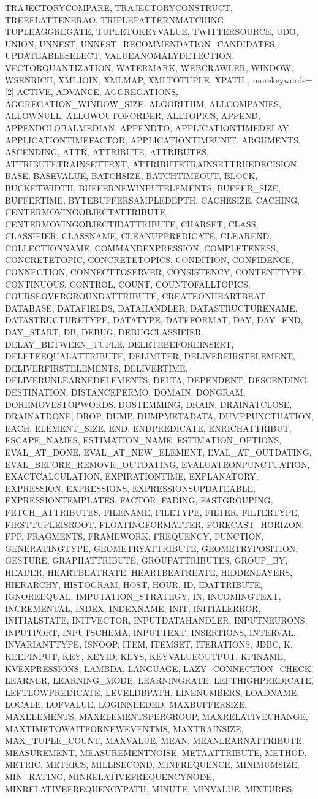 {{TRAJECTORYCOMPARE, TRAJECTORYCONSTRUCT, TREEFLATTENERAO, TRIPLEPATTERNMATCHING, TUPLEAGGREGATE, TUPLETOKEYVALUE, TWITTERSOURCE, UDO, UNION, UNNEST, UNNEST_RECOMMENDATION_CANDIDATES, UPDATEABLESELECT, VALUEANOMALYDETECTION, VECTORQUANTIZATION, WATERMARK, WEBCRAWLER, WINDOW, WSENRICH, XMLJOIN, XMLMAP, XMLTOTUPLE, XPATH%
      },%
   morekeywords=[2]{%
ACTIVE, ADVANCE, AGGREGATIONS, AGGREGATION_WINDOW_SIZE, ALGORITHM, ALLCOMPANIES, ALLOWNULL, ALLOWOUTOFORDER, ALLTOPICS, APPEND, APPENDGLOBALMEDIAN, APPENDTO, APPLICATIONTIMEDELAY, APPLICATIONTIMEFACTOR, APPLICATIONTIMEUNIT, ARGUMENTS, ASCENDING, ATTR, ATTRIBUTE, ATTRIBUTES, ATTRIBUTETRAINSETTEXT, ATTRIBUTETRAINSETTRUEDECISION, BASE, BASEVALUE, BATCHSIZE, BATCHTIMEOUT, BLOCK, BUCKETWIDTH, BUFFERNEWINPUTELEMENTS, BUFFER_SIZE, BUFFERTIME, BYTEBUFFERSAMPLEDEPTH, CACHESIZE, CACHING, CENTERMOVINGOBJECTATTRIBUTE, CENTERMOVINGOBJECTIDATTRIBUTE, CHARSET, CLASS, CLASSIFIER, CLASSNAME, CLEANUPPREDICATE, CLEAREND, COLLECTIONNAME, COMMANDEXPRESSION, COMPLETENESS, CONCRETETOPIC, CONCRETETOPICS, CONDITION, CONFIDENCE, CONNECTION, CONNECTTOSERVER, CONSISTENCY, CONTENTTYPE, CONTINUOUS, CONTROL, COUNT, COUNTOFALLTOPICS, COURSEOVERGROUNDATTRIBUTE, CREATEONHEARTBEAT, DATABASE, DATAFIELDS, DATAHANDLER, DATASTRUCTURENAME, DATASTRUCTURETYPE, DATATYPE, DATEFORMAT, DAY, DAY_END, DAY_START, DB, DEBUG, DEBUGCLASSIFIER, DELAY_BETWEEN_TUPLE, DELETEBEFOREINSERT, DELETEEQUALATTRIBUTE, DELIMITER, DELIVERFIRSTELEMENT, DELIVERFIRSTELEMENTS, DELIVERTIME, DELIVERUNLEARNEDELEMENTS, DELTA, DEPENDENT, DESCENDING, DESTINATION, DISTANCEPERMO, DOMAIN, DONGRAM, DOREMOVESTOPWORDS, DOSTEMMING, DRAIN, DRAINATCLOSE, DRAINATDONE, DROP, DUMP, DUMPMETADATA, DUMPPUNCTUATION, EACH, ELEMENT_SIZE, END, ENDPREDICATE, ENRICHATTRIBUT, ESCAPE_NAMES, ESTIMATION_NAME, ESTIMATION_OPTIONS, EVAL_AT_DONE, EVAL_AT_NEW_ELEMENT, EVAL_AT_OUTDATING, EVAL_BEFORE_REMOVE_OUTDATING, EVALUATEONPUNCTUATION, EXACTCALCULATION, EXPIRATIONTIME, EXPLANATORY, EXPRESSION, EXPRESSIONS, EXPRESSIONSUPDATEABLE, EXPRESSIONTEMPLATES, FACTOR, FADING, FASTGROUPING, FETCH_ATTRIBUTES, FILENAME, FILETYPE, FILTER, FILTERTYPE, FIRSTTUPLEISROOT, FLOATINGFORMATTER, FORECAST_HORIZON, FPP, FRAGMENTS, FRAMEWORK, FREQUENCY, FUNCTION, GENERATINGTYPE, GEOMETRYATTRIBUTE, GEOMETRYPOSITION, GESTURE, GRAPHATTRIBUTE, GROUPATTRIBUTES, GROUP_BY, HEADER, HEARTBEATRATE, HEARTBEATREATE, HIDDENLAYERS, HIERARCHY, HISTOGRAM, HOST, HOUR, ID, IDATTRIBUTE, IGNOREEQUAL, IMPUTATION_STRATEGY, IN, INCOMINGTEXT, INCREMENTAL, INDEX, INDEXNAME, INIT, INITIALERROR, INITIALSTATE, INITVECTOR, INPUTDATAHANDLER, INPUTNEURONS, INPUTPORT, INPUTSCHEMA, INPUTTEXT, INSERTIONS, INTERVAL, INVARIANTTYPE, ISNOOP, ITEM, ITEMSET, ITERATIONS, JDBC, K, KEEPINPUT, KEY, KEYID, KEYS, KEYVALUEOUTPUT, KPINAME, KVEXPRESSIONS, LAMBDA, LANGUAGE, LAZY_CONNECTION_CHECK, LEARNER, LEARNING_MODE, LEARNINGRATE, LEFTHIGHPREDICATE, LEFTLOWPREDICATE, LEVELDBPATH, LINENUMBERS, LOADNAME, LOCALE, LOFVALUE, LOGINNEEDED, MAXBUFFERSIZE, MAXELEMENTS, MAXELEMENTSPERGROUP, MAXRELATIVECHANGE, MAXTIMETOWAITFORNEWEVENTMS, MAXTRAINSIZE, MAX_TUPLE_COUNT, MAXVALUE, MEAN, MEANLEARNATTRIBUTE, MEASUREMENT, MEASUREMENTNOISE, METAATTRIBUTE, METHOD, METRIC, METRICS, MILLISECOND, MINFREQUENCE, MINIMUMSIZE, MIN_RATING, MINRELATIVEFREQUENCYNODE, MINRELATIVEFREQUENCYPATH, MINUTE, MINVALUE, MIXTURES, }}
